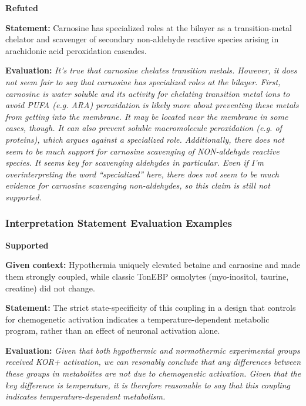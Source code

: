 \documentclass{article}
\begin{document}
\vspace{0.5em}
\noindent\textbf{\large Refuted}

\vspace{0.5em}
\noindent\textbf{Statement:} Carnosine has specialized roles at the bilayer as a transition-metal chelator and scavenger of secondary non‑aldehyde reactive species arising in arachidonic acid peroxidation cascades.

\vspace{0.5em}
\noindent\textbf{Evaluation:} \textit{It's true that carnosine chelates transition metals. However, it does not seem fair to say that carnosine has specialized roles at the bilayer. First, carnosine is water soluble and its activity for chelating transition metal ions to avoid PUFA (e.g. ARA) peroxidation is likely more about preventing these metals from getting into the membrane. It may be located near the membrane in some cases, though. It can also prevent soluble macromolecule peroxidation (e.g. of proteins), which argues against a specialized role. Additionally, there does not seem to be much support for carnosine scavenging of NON-aldehyde reactive species. It seems key for scavenging aldehydes in particular. Even if I'm overinterpreting the word ``specialized'' here, there does not seem to be much evidence for carnosine scavenging non-aldehydes, so this claim is still not supported.}
\vspace{1em}


\subsubsection*{Interpretation Statement Evaluation Examples}

\vspace{0.5em}
\noindent\textbf{\large Supported}

\vspace{0.5em}
\noindent\textbf{Given context:} Hypothermia uniquely elevated betaine and carnosine and made them strongly coupled, while classic TonEBP osmolytes (myo-inositol, taurine, creatine) did not change.

\vspace{0.5em}
\noindent\textbf{Statement:} The strict state-specificity of this coupling in a design that controls for chemogenetic activation indicates a temperature-dependent metabolic program, rather than an effect of neuronal activation alone.

\vspace{0.5em}
\noindent\textbf{Evaluation:} \textit{Given that both hypothermic and normothermic experimental groups received KOR+ activation, we can resonably conclude that any differences between these groups in metabolites are not due to chemogenetic activation. Given that the key difference is temperature, it is therefore reasonable to say that this coupling indicates temperature-dependent metabolism.}
\end{document}
